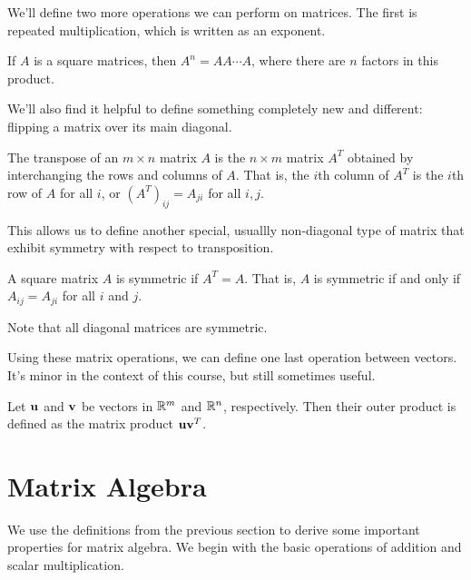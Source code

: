 \documentclass[../m073main.tex]{subfiles}
\begin{document}
We'll define two more operations we can perform on matrices.
The first is repeated multiplication, which is written as an exponent.

\begin{definition}
	If $A$ is a square matrices, then $A^n = AA\cdots A$, where there are $n$ factors in this product.
\end{definition}

We'll also find it helpful to define something completely new and different: flipping a matrix over its main diagonal.

\begin{definition}
	The transpose of an $m\times n$ matrix $A$ is the $n\times m$ matrix $A^T$ obtained by interchanging the rows and columns of $A$.
	That is, the $i$th column of $A^T$ is the $i$th row of $A$ for all $i$, or $(A^T)_{ij} = A_{ji}$ for all $i, j$.
\end{definition}

This allows us to define another special, usuallly non-diagonal type of matrix that exhibit symmetry with respect to transposition.

\begin{definition}
	A square matrix $A$ is symmetric if $A^T = A$.
	That is, $A$ is symmetric if and only if $A_{ij} = A_{ji}$ for all $i$ and $j$.
\end{definition}

Note that all diagonal matrices are symmetric.

Using these matrix operations, we can define one last operation between vectors.
It's minor in the context of this course, but still sometimes useful.

\begin{definition}
	Let $\mathbf{u}$ and $\mathbf{v}$ be vectors in $\mathbb{R}^m$ and $\mathbb{R}^n$, respectively.
	Then their outer product is defined as the matrix product $\mathbf{u}\mathbf{v}^T$.
\end{definition}

\section{Matrix Algebra}
We use the definitions from the previous section to derive some important properties for matrix algebra.
We begin with the basic operations of addition and scalar multiplication.
\end{document}
